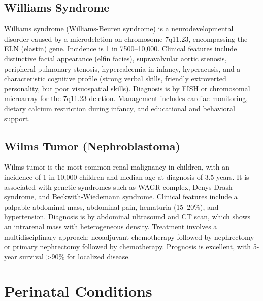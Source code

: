 \subsection{Williams Syndrome}
\label{sec:Williams Syndrome}
Williams syndrome (Williams-Beuren syndrome) is a neurodevelopmental disorder caused by a microdeletion on chromosome 7q11.23, encompassing the ELN (elastin) gene. Incidence is 1 in 7500--10,000. Clinical features include distinctive facial appearance (elfin facies), supravalvular aortic stenosis, peripheral pulmonary stenosis, hypercalcemia in infancy, hyperacusis, and a characteristic cognitive profile (strong verbal skills, friendly extroverted personality, but poor visuospatial skills). Diagnosis is by FISH or chromosomal microarray for the 7q11.23 deletion. Management includes cardiac monitoring, dietary calcium restriction during infancy, and educational and behavioral support.

\subsection{Wilms Tumor (Nephroblastoma)}
\label{sec:Wilms Tumor}
Wilms tumor is the most common renal malignancy in children, with an incidence of 1 in 10,000 children and median age at diagnosis of 3.5 years. It is associated with genetic syndromes such as WAGR complex, Denys-Drash syndrome, and Beckwith-Wiedemann syndrome. Clinical features include a palpable abdominal mass, abdominal pain, hematuria (15--20\%), and hypertension. Diagnosis is by abdominal ultrasound and CT scan, which shows an intrarenal mass with heterogeneous density. Treatment involves a multidisciplinary approach: neoadjuvant chemotherapy followed by nephrectomy or primary nephrectomy followed by chemotherapy. Prognosis is excellent, with 5-year survival >90\% for localized disease.

\section{Perinatal Conditions}




